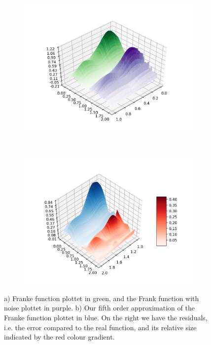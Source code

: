 \begin{figure}[H]
\centering
      \begin{subfigure}{0.45\textwidth}
       	\centering
       	\includegraphics[width=\linewidth]{result/bilder/Franke_noise.png}
        	\caption{}
     \end{subfigure}
     ~
     \begin{subfigure}{0.45\textwidth}
       	\centering
       	\includegraphics[width=\linewidth]{result/bilder/OLS_bar.png}
        	\caption{}
    	\end{subfigure}
 	\caption{a) Franke function plottet in green, and the Frank function with noise plottet in purple. b) Our fifth order approximation of the Franke function plottet in blue. On the right we have the residuals, i.e. the error compared to the real function, and its relative size indicated by the red colour gradient.}
	\label{fig:OLS_Frank}
\end{figure}


